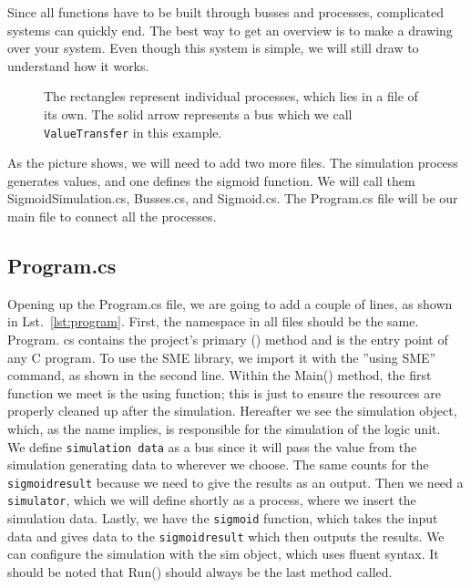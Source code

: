 Since all functions have to be built through busses and processes, complicated systems can quickly end. The best way to get an overview is to make a drawing over your system. Even though this system is simple, we will still draw to understand how it works.\\

\begin{figure}
  \centering
    \caption{The rectangles represent individual processes, which lies in a file of its own. The solid arrow represents a bus which we call \texttt{ValueTransfer} in this example.}
    \label{fig:csptree}
\end{figure}

As the picture shows, we will need to add two more files. 
The simulation process generates values, and one defines the sigmoid function.
We will call them SigmoidSimulation.cs, Busses.cs, and Sigmoid.cs.
The Program.cs file will be our main file to connect all the processes.



\subsection{Program.cs}
Opening up the Program.cs file, we are going to add a couple of lines, as shown in Lst.~\ref{lst:program}.
First, the namespace in all files should be the same.
Program. cs contains the project’s primary () method and is the entry point of any C\texthash 
program. To use the SME library, we import it with the ”using SME” command, as shown
in the second line.
Within the Main() method, the first function we meet is the using function; this is just
to ensure the resources are properly cleaned up after the simulation.
Hereafter we see the simulation object, which, as the name implies, is responsible for the
simulation of the logic unit. \\

We define \texttt{simulation data} as a bus since it will pass the value from the simulation generating data to wherever we choose. The same counts for the \texttt{sigmoidresult} because we need to give the results as an output. 
Then we need a \texttt{simulator}, which we will define shortly as a process, where we insert the simulation data.
Lastly, we have the \texttt{sigmoid} function, which takes the input data and gives data to the \texttt{sigmoidresult} which then outputs the results.
We can configure the simulation with the sim object, which uses fluent syntax.
It should be noted that Run() should always be the last method called. \\


